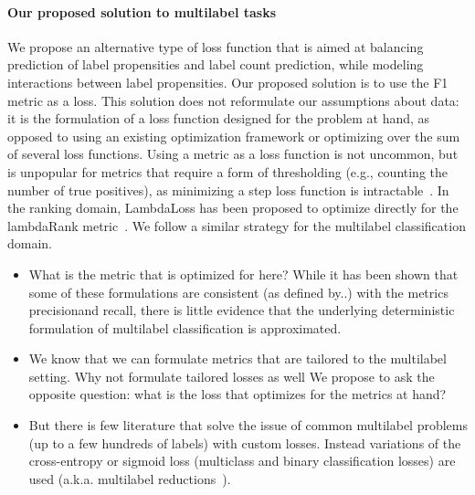 \paragraph{Our proposed solution to multilabel tasks}
We propose an alternative type of loss function that is aimed at balancing prediction of label propensities and label count prediction, while modeling interactions between label propensities. Our proposed solution is to use the F1 metric as a loss. This solution does not reformulate our assumptions about data: it is the formulation of a loss function designed for the problem at hand, as opposed to using an existing optimization framework or optimizing over the sum of several loss functions.
Using a metric as a loss function is not uncommon, but is unpopular for metrics that require a form of thresholding (e.g., counting the number of true positives), as minimizing a step loss function is intractable~\cite{stochasticNegativeMining}. In the ranking domain, LambdaLoss has been proposed to optimize directly for the lambdaRank metric~\cite{lambdaLoss}. We follow a similar strategy for the multilabel classification domain. 

\begin{itemize}[leftmargin=*,nosep]
\item{What is the metric that is optimized for here? While it has been shown that some of these formulations are consistent (as defined by..) with the metrics precision\@K and recall\@K, there is little evidence that the underlying deterministic formulation of multilabel classification is approximated.}
\item{We know that we can formulate metrics that are tailored to the multilabel setting. Why not formulate tailored losses as well
We propose to ask the opposite question: what is the loss that optimizes for the metrics at hand?}
\item{But there is few literature that solve the issue of common multilabel problems (up to a few hundreds of labels) with custom losses. Instead variations of the cross-entropy or sigmoid loss (multiclass and binary classification losses) are used (a.k.a. multilabel reductions~\cite{multilabelReduction}).}
\end{itemize}


